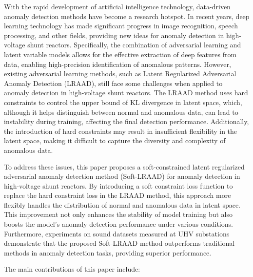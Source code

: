 \documentclass{article}
\begin{document}
With the rapid development of artificial intelligence technology, data-driven anomaly detection methods have become a research hotspot. In recent years, deep learning technology has made significant progress in image recognition, speech processing, and other fields, providing new ideas for anomaly detection in high-voltage shunt reactors. Specifically, the combination of adversarial learning and latent variable models allows for the effective extraction of deep features from data, enabling high-precision identification of anomalous patterns. However, existing adversarial learning methods, such as Latent Regularized Adversarial Anomaly Detection (LRAAD), still face some challenges when applied to anomaly detection in high-voltage shunt reactors. The LRAAD method uses hard constraints to control the upper bound of KL divergence in latent space, which, although it helps distinguish between normal and anomalous data, can lead to instability during training, affecting the final detection performance. Additionally, the introduction of hard constraints may result in insufficient flexibility in the latent space, making it difficult to capture the diversity and complexity of anomalous data.

To address these issues, this paper proposes a soft-constrained latent regularized adversarial anomaly detection method (Soft-LRAAD) for anomaly detection in high-voltage shunt reactors. By introducing a soft constraint loss function to replace the hard constraint loss in the LRAAD method, this approach more flexibly handles the distribution of normal and anomalous data in latent space. This improvement not only enhances the stability of model training but also boosts the model's anomaly detection performance under various conditions. Furthermore, experiments on sound datasets measured at UHV substations demonstrate that the proposed Soft-LRAAD method outperforms traditional methods in anomaly detection tasks, providing superior performance.

The main contributions of this paper include:
\end{document}
